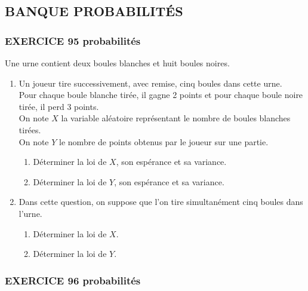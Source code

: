 \documentclass[10pt,oneside]{article}
\begin{document}
\begin{flushleft}
\pagebreak


\part*{BANQUE PROBABILIT\'ES}
\section*{EXERCICE 95 \:probabilités}


Une urne contient deux boules blanches et huit boules noires.\\
\begin{enumerate}
\item
Un joueur tire successivement, avec remise,  cinq boules dans cette urne.\\
Pour chaque boule blanche tirée, il gagne 2 points et pour chaque boule noire tirée, il perd 3 points.\\
On note $X$ la variable aléatoire représentant le nombre de boules blanches tirées.\\
On note $Y$ le nombre de points obtenus par le joueur sur une partie.
\begin{enumerate}
\item
Déterminer la loi de $X$, son espérance et sa variance.
\item
Déterminer la loi de $Y$, son espérance et sa variance.
\end{enumerate}
\item
Dans cette question, on suppose que l'on tire simultanément cinq boules dans l'urne.
\begin{enumerate}
\item 
Déterminer la loi de $X$.
\item
Déterminer la loi de $Y$.

\end{enumerate}
\end{enumerate}

\section*{EXERCICE 96 \:probabilités}




\end{flushleft}
\end{document}
